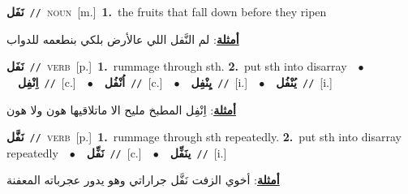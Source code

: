 \documentclass[10pt,a4paper,twoside]{article} %
\begin{document}
\begin{multicols}{2}
{\setlength\topsep{0pt}\textbf{\foreignlanguage{arabic}{نَفَل}}\ {\color{gray}\texttt{//}\color{black}}\ \textsc{noun}\ [m.]\ \textbf{1.}~the fruits that fall down before they ripen\  \begin{flushright}\color{gray}\foreignlanguage{arabic}{\textbf{\underline{\foreignlanguage{arabic}{أمثلة}}}: لم النَّفل اللي عالأرض بلكي بنطعمه للدواب}\end{flushright}\color{black}} \vspace{2mm}

{\setlength\topsep{0pt}\textbf{\foreignlanguage{arabic}{نَفَل}}\ {\color{gray}\texttt{//}\color{black}}\ \textsc{verb}\ [p.]\ \textbf{1.}~rummage through sth.  \textbf{2.}~put sth into disarray\ \ $\bullet$\ \ \setlength\topsep{0pt}\textbf{\foreignlanguage{arabic}{اِنْفِل}}\ {\color{gray}\texttt{//}\color{black}}\ [c.]\ \ $\bullet$\ \ \setlength\topsep{0pt}\textbf{\foreignlanguage{arabic}{اُنْفُل}}\ {\color{gray}\texttt{//}\color{black}}\ [c.]\ \ $\bullet$\ \ \setlength\topsep{0pt}\textbf{\foreignlanguage{arabic}{يِنْفِل}}\ {\color{gray}\texttt{//}\color{black}}\ [i.]\ \ $\bullet$\ \ \setlength\topsep{0pt}\textbf{\foreignlanguage{arabic}{يُنْفُل}}\ {\color{gray}\texttt{//}\color{black}}\ [i.]\  \begin{flushright}\color{gray}\foreignlanguage{arabic}{\textbf{\underline{\foreignlanguage{arabic}{أمثلة}}}: اِنْفِل المطبخ مليح الا ماتلاقيها هون ولا هون}\end{flushright}\color{black}} \vspace{2mm}

{\setlength\topsep{0pt}\textbf{\foreignlanguage{arabic}{نَفَّل}}\ {\color{gray}\texttt{//}\color{black}}\ \textsc{verb}\ [p.]\ \textbf{1.}~rummage through sth repeatedly.  \textbf{2.}~put sth into disarray repeatedly\ \ $\bullet$\ \ \setlength\topsep{0pt}\textbf{\foreignlanguage{arabic}{نَفِّل}}\ {\color{gray}\texttt{//}\color{black}}\ [c.]\ \ $\bullet$\ \ \setlength\topsep{0pt}\textbf{\foreignlanguage{arabic}{ينَفِّل}}\ {\color{gray}\texttt{//}\color{black}}\ [i.]\  \begin{flushright}\color{gray}\foreignlanguage{arabic}{\textbf{\underline{\foreignlanguage{arabic}{أمثلة}}}: أخوي الزفت نَفَّل جراراتي وهو يدور عجرباته المعفنة}\end{flushright}\color{black}} \vspace{2mm}


\end{multicols}
\end{document}
